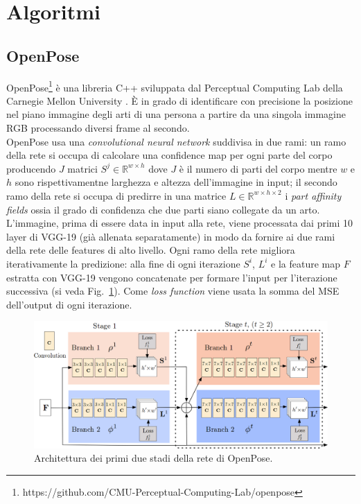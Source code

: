 \documentclass[10pt,twocolumn]{article}
\newcommand{\Fig}[1]{Fig.~\ref{#1}}
\begin{document}
\section{Algoritmi}
  \subsection{OpenPose}
  OpenPose\footnote{https://github.com/CMU-Perceptual-Computing-Lab/openpose} è
  una libreria C++ sviluppata dal Perceptual Computing Lab della Carnegie Mellon
  University \cite{cao2017realtime}. È in grado di identificare con precisione
  la posizione nel piano immagine degli arti di una persona a partire da una
  singola immagine RGB processando diversi frame al secondo. \\ 
  OpenPose usa una \textit{convolutional neural network} suddivisa in due rami:
  un ramo della rete si occupa di calcolare una confidence map per ogni parte
  del corpo producendo $J$ matrici $S^j \in \mathbb{R}^{w \times h}$ dove $J$ è
  il numero di parti del corpo mentre $w$ e $h$ sono rispettivamentne larghezza
  e altezza dell'immagine in input; il secondo ramo della rete si occupa di
  predirre in una matrice $L \in \mathbb{R}^{w \times h \times 2}$ i
  \textit{part affinity fields} ossia il grado di confidenza che due parti siano
  collegate da un arto. L'immagine, prima di essere data in input alla rete,
  viene processata dai primi 10 layer di VGG-19 \cite{simo2015verydeepconv} (già
  allenata separatamente) in modo da fornire ai due rami della rete delle
  features di alto livello. Ogni ramo della rete migliora iterativamente la
  predizione: alla fine di ogni iterazione $S^i$, $L^i$ e la feature map $F$
  estratta con VGG-19 vengono concatenate per formare l'input per
  l'iterazione successiva (si veda \Fig{f:openpose_cnn}). Come \textit{loss
  function} viene usata la somma del MSE dell'output di ogni iterazione. 
  
  \begin{figure}[h]
    \centering
    \includegraphics[width=\linewidth]{immagini/openpose-cnn.png}
    \caption{Architettura dei primi due stadi della rete di OpenPose.}
    \label{f:openpose_cnn}
  \end{figure}
\end{document}

